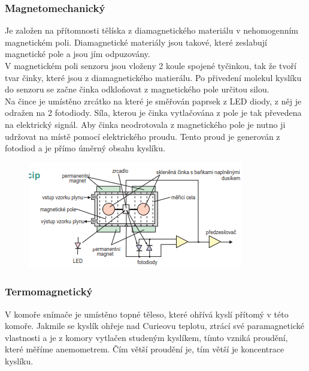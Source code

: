 \subsubsection*{Magnetomechanický}
Je založen na přítomnosti tělíska z diamagnetického materiálu v nehomogenním magnetickém poli. Diamagnetické materiály jsou takové, které zeslabují magnetické pole a jsou jím odpuzovány.\\
V magnetickém poli senzoru jsou vloženy 2 koule spojené tyčinkou, tak že tvoří tvar činky, které jsou z diamagnetického matierálu. Po přivedení molekul kyslíku do senzoru se začne činka odkloňovat z magnetického pole určitou silou.\\
Na čince je umístěno zrcátko na které je směřován paprsek z LED diody, z něj je odražen na 2 fotodiody. Síla, kterou je činka vytlačována z pole je tak převedena na elektrický signál. Aby činka neodrotovala z magnetického pole je nutno ji udržovat na místě pomocí elektrického proudu. Tento proud je generován z fotodiod a je přímo úměrný obsahu kyslíku.\\
\begin{figure}[h!]
    \centering
    \includegraphics[scale = 0.5]{img/Paramag1.png}
\end{figure}

\subsubsection*{Termomagnetický}
V komoře snímače je umístěno topné těleso, které ohřívá kyslí přítomý v této komoře. Jakmile se kyslík ohřeje nad Curieovu teplotu, ztrácí své paramagnetické vlastnosti a je z komory vytlačen studeným kyslíkem, tímto vzniká proudění, které měříme anemometrem. Čím větší proudění je, tím větší je koncentrace kyslíku.\\

